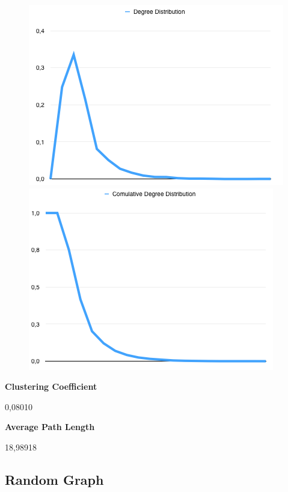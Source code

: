 \documentclass[a4paper,titlepage,11pt]{article}
\begin{document}
\begin{figure}[h]
    \centering
    \includegraphics[scale=0.50]{img/dd-dataset.png}
    \includegraphics[scale=0.50]{img/cdd-dataset.png}
\end{figure}

\begin{multicols}{2}

  \textbf{Clustering Coefficient}

  0,08010

\columnbreak

  \textbf{Average Path Length}

  18,98918


\end{multicols}

\subsection{Random Graph}
\end{document}

